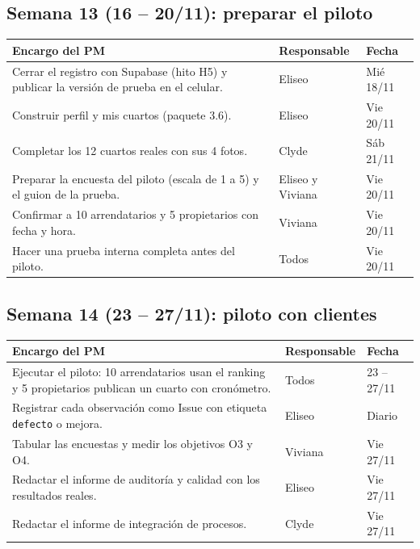 \documentclass[11pt,a4paper]{article}
\begin{document}
\subsection{Semana 13 (16 -- 20/11): preparar el piloto}
{\small
{}
\noindent\begin{tabularx}{\textwidth}{@{}L P{2.7cm} C{1.6cm}@{}}
\toprule
{}
\textbf{Encargo del PM} & \textbf{Responsable} & \textbf{Fecha} \\
\midrule
Cerrar el registro con Supabase (hito H5) y publicar la versión de prueba en el celular. & Eliseo & Mié 18/11 \\
Construir perfil y mis cuartos (paquete 3.6). & Eliseo & Vie 20/11 \\
Completar los 12 cuartos reales con sus 4 fotos. & Clyde & Sáb 21/11 \\
Preparar la encuesta del piloto (escala de 1 a 5) y el guion de la prueba. & Eliseo y Viviana & Vie 20/11 \\
Confirmar a 10 arrendatarios y 5 propietarios con fecha y hora. & Viviana & Vie 20/11 \\
Hacer una prueba interna completa antes del piloto. & Todos & Vie 20/11 \\
\bottomrule
\end{tabularx}
}

\subsection{Semana 14 (23 -- 27/11): piloto con clientes}
{\small
{}
\noindent\begin{tabularx}{\textwidth}{@{}L P{2.7cm} C{1.6cm}@{}}
\toprule
{}
\textbf{Encargo del PM} & \textbf{Responsable} & \textbf{Fecha} \\
\midrule
Ejecutar el piloto: 10 arrendatarios usan el ranking y 5 propietarios publican un cuarto con cronómetro. & Todos & 23 -- 27/11 \\
Registrar cada observación como Issue con etiqueta \texttt{defecto} o mejora. & Eliseo & Diario \\
Tabular las encuestas y medir los objetivos O3 y O4. & Viviana & Vie 27/11 \\
Redactar el informe de auditoría y calidad con los resultados reales. & Eliseo & Vie 27/11 \\
Redactar el informe de integración de procesos. & Clyde & Vie 27/11 \\
\bottomrule
\end{tabularx}
}
\end{document}

